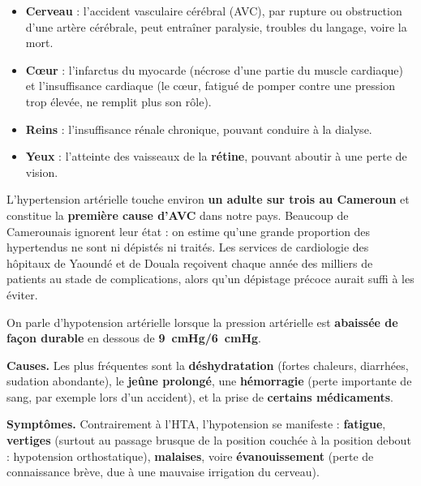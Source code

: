 \documentclass[11pt]{article}
\newcommand{\cle}[1]{{\popxbold\color{popdark}#1}}
\newcounter{popsec}
\newcounter{popsub}
\newcommand{\courssub}[1]{%
  \stepcounter{popsub}%
  \par\vspace{9pt}\noindent{\popxbold\fontsize{11.5}{13}\selectfont\color{popink}{\color{poporange}\thepopsec.\thepopsub}\hspace{6pt}#1}\par\nopagebreak\vspace{4pt}
}
\begin{document}
\begin{itemize}
\item \textbf{Cerveau} : l'\cle{accident vasculaire cérébral} (AVC), par rupture ou obstruction d'une artère cérébrale, peut entraîner paralysie, troubles du langage, voire la mort.
\item \textbf{C\oe ur} : l'\cle{infarctus du myocarde} (nécrose d'une partie du muscle cardiaque) et l'\cle{insuffisance cardiaque} (le c\oe ur, fatigué de pomper contre une pression trop élevée, ne remplit plus son rôle).
\item \textbf{Reins} : l'\cle{insuffisance rénale} chronique, pouvant conduire à la dialyse.
\item \textbf{Yeux} : l'atteinte des vaisseaux de la \textbf{rétine}, pouvant aboutir à une perte de vision.
\end{itemize}

\begin{savaistu}
L'hypertension artérielle touche environ \textbf{un adulte sur trois au Cameroun} et constitue la \textbf{première cause d'AVC} dans notre pays. Beaucoup de Camerounais ignorent leur état : on estime qu'une grande proportion des hypertendus ne sont ni dépistés ni traités. Les services de cardiologie des hôpitaux de Yaoundé et de Douala reçoivent chaque année des milliers de patients au stade de complications, alors qu'un dépistage précoce aurait suffi à les éviter.
\end{savaistu}

\courssub{L'hypotension artérielle}

\begin{definition}
On parle d'\cle{hypotension artérielle} lorsque la pression artérielle est \textbf{abaissée de façon durable} en dessous de \textbf{\SI{9}{cmHg}/\SI{6}{cmHg}}.
\end{definition}

\textbf{Causes.} Les plus fréquentes sont la \textbf{déshydratation} (fortes chaleurs, diarrhées, sudation abondante), le \textbf{jeûne prolongé}, une \textbf{hémorragie} (perte importante de sang, par exemple lors d'un accident), et la prise de \textbf{certains médicaments}.

\textbf{Symptômes.} Contrairement à l'HTA, l'hypotension se manifeste : \textbf{fatigue}, \textbf{vertiges} (surtout au passage brusque de la position couchée à la position debout : hypotension orthostatique), \textbf{malaises}, voire \textbf{évanouissement} (perte de connaissance brève, due à une mauvaise irrigation du cerveau).
\end{document}
